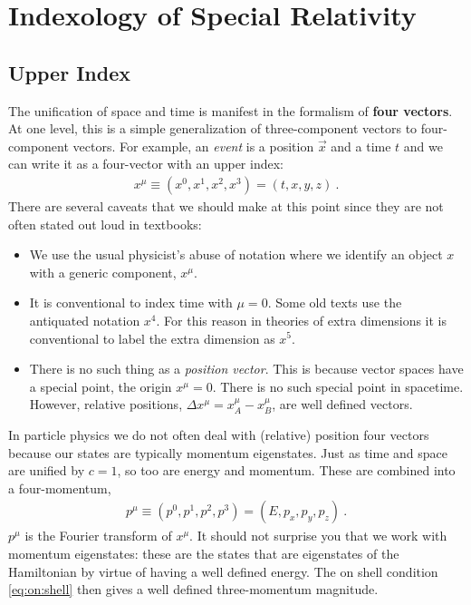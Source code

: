 \documentclass[12pt, oneside]{report}    %
\let\oldsection\section
\def\section{%
  \setcounter{sidenote}{1}%
  \oldsection
}
\begin{document}
\section{Indexology of Special Relativity}

\subsection{Upper Index}\label{sec:index:upper}

The unification of space and time is manifest in the formalism of \textbf{four vectors}. At one level, this is a simple generalization of three-component vectors to four-component vectors. For example, an \emph{event} is a position $\vec{x}$ and a time $t$ and we can write it as a four-vector with an upper index:
\begin{align}
    x^\mu \equiv (x^0, x^1, x^2, x^3) = (t,x,y,z) \ .
\end{align}
There are several caveats that we should make at this point since they are not often stated out loud in textbooks:
\begin{itemize}
    \item We use the usual physicist's abuse of notation where we identify an object $x$ with a generic component, $x^\mu$. 
    \item It is conventional to index time with $\mu=0$. Some old texts use the antiquated notation $x^4$. For this reason in theories of extra dimensions it is conventional to label the extra dimension as $x^5$. 
    \item There is no such thing as a \emph{position vector}. This is because vector spaces have a special point, the origin $x^\mu = 0$. There is no such special point in spacetime. However, relative positions, $\Delta x^\mu = x_A^\mu - x_B^\mu$, are well defined vectors. 
\end{itemize}
In particle physics we do not often deal with (relative) position four vectors because our states are typically momentum eigenstates. Just as time and space are unified by $c=1$, so too are energy and momentum. These are combined into a four-momentum,
\begin{align}
    p^\mu \equiv (p^0, p^1, p^2, p^3) = (E, p_x, p_y, p_z) \ .
\end{align}
$p^\mu$ is the Fourier transform of $x^\mu$. It should not surprise you that we work with momentum eigenstates: these are the states that are eigenstates of the Hamiltonian by virtue of having a well defined energy. The on shell condition \eqref{eq:on:shell} then gives a well defined three-momentum magnitude.
\end{document}
